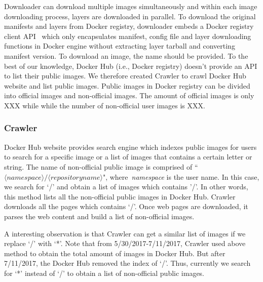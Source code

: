 Downloader can download multiple images simultaneously and within each image downloading process, layers are downloaded in parallel.
%
To download the original manifests and layers from Docker registry, downloader embeds a Docker registry client API~\cite{xxx} which only encapsulates manifest, config file and layer downloading functions in Docker engine without extracting layer tarball and converting manifest version. 
%
%
To download an image, the name should be provided.
%
%
To the best of our knowledge, Docker Hub (i.e., Docker registry) doesn't provide an API to list their public images.
%
We therefore created Crawler to crawl Docker Hub website and list public images.
%
Public images in Docker registry can be divided into official images and non-official images.
%
The amount of official images is only XXX while 
while the number of  non-official user images is XXX.





\subsubsection{Crawler}

Docker Hub website provides search engine which indexes public images for users to search for a specific image or a list of images that contains a certain letter or string.
%
The name of non-official public image is comprised of ``$\langle namespace\rangle/\langle repository name \rangle$", where~\textit{namespace} is the user name.
%
In this case, we search for `/' and obtain a list of images which contains '/'.
%
In other words, this method lists all the non-official public images in Docker Hub.
%
Crawler downloads all the pages which contains `/'.
%
Once web pages are downloaded, it parses the web content and build a list of non-official images. 





A interesting observation is that Crawler can get a similar list of images if we replace `/' with `*'.
%
Note that from 5/30/2017-7/11/2017, Crawler used above method to obtain the total amount of images in Docker Hub.
%
But after 7/11/2017, the Docker Hub removed the index of `/'.
%
Thus, currently we search for `*' instead of `/' to obtain a list of non-official public images.
%






